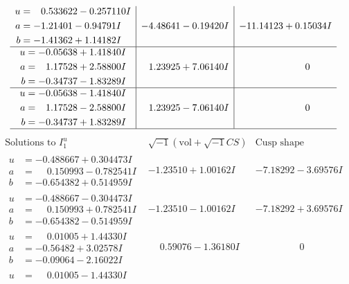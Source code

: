 \documentclass[1p]{elsarticle_modified}
\theoremstyle{definition}
\newcommand{\I}{\sqrt{-1}}
\begin{document}
$$\begin{array}{c|c|c}
\begin{aligned}
u &= \phantom{-}0.533622 - 0.257110 I \\
a &= -1.21401 - 0.94791 I \\
b &= -1.41362 + 1.14182 I\end{aligned}
 & -4.48641 - 0.19420 I & -11.14123 + 0.15034 I \\ \hline\begin{aligned}
u &= -0.05638 + 1.41840 I \\
a &= \phantom{-}1.17528 + 2.58800 I \\
b &= -0.34737 - 1.83289 I\end{aligned}
 & \phantom{-}1.23925 + 7.06140 I & \phantom{-0.000000 } 0 \\ \hline\begin{aligned}
u &= -0.05638 - 1.41840 I \\
a &= \phantom{-}1.17528 - 2.58800 I \\
b &= -0.34737 + 1.83289 I\end{aligned}
 & \phantom{-}1.23925 - 7.06140 I & \phantom{-0.000000 } 0\\
 \hline 
 \end{array}$$\newpage$$\begin{array}{c|c|c}  
\text{Solutions to }I^u_{1}& \I (\text{vol} + \sqrt{-1}CS) & \text{Cusp shape}\\
 \hline 
\begin{aligned}
u &= -0.488667 + 0.304473 I \\
a &= \phantom{-}0.150993 - 0.782541 I \\
b &= -0.654382 + 0.514959 I\end{aligned}
 & -1.23510 + 1.00162 I & -7.18292 - 3.69576 I \\ \hline\begin{aligned}
u &= -0.488667 - 0.304473 I \\
a &= \phantom{-}0.150993 + 0.782541 I \\
b &= -0.654382 - 0.514959 I\end{aligned}
 & -1.23510 - 1.00162 I & -7.18292 + 3.69576 I \\ \hline\begin{aligned}
u &= \phantom{-}0.01005 + 1.44330 I \\
a &= -0.56482 + 3.02578 I \\
b &= -0.09064 - 2.16022 I\end{aligned}
 & \phantom{-}0.59076 - 1.36180 I & \phantom{-0.000000 } 0 \\ \hline\begin{aligned}
u &= \phantom{-}0.01005 - 1.44330 I \\

\end{aligned}
\end{array}$$
\end{document}
